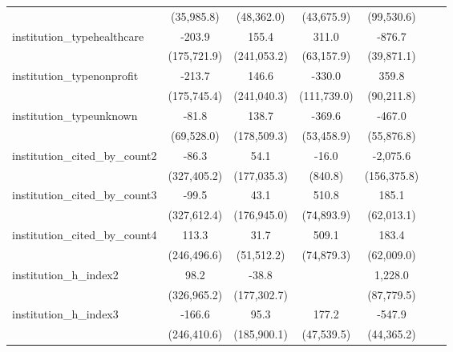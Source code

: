 \begin{tabular}{lcccccc}
                                         & (35,985.8)  & (48,362.0)  & (43,675.9)  & (99,530.6)  &       &   \\   
   institution\_typehealthcare           & -203.9      & 155.4       & 311.0       & -876.7      &       &   \\   
                                         & (175,721.9) & (241,053.2) & (63,157.9)  & (39,871.1)  &       &   \\   
   institution\_typenonprofit            & -213.7      & 146.6       & -330.0      & 359.8       &       &   \\   
                                         & (175,745.4) & (241,040.3) & (111,739.0) & (90,211.8)  &       &   \\   
   institution\_typeunknown              & -81.8       & 138.7       & -369.6      & -467.0      &       &   \\   
                                         & (69,528.0)  & (178,509.3) & (53,458.9)  & (55,876.8)  &       &   \\   
   institution\_cited\_by\_count2        & -86.3       & 54.1        & -16.0       & -2,075.6    &       &   \\   
                                         & (327,405.2) & (177,035.3) & (840.8)     & (156,375.8) &       &   \\   
   institution\_cited\_by\_count3        & -99.5       & 43.1        & 510.8       & 185.1       &       &   \\   
                                         & (327,612.4) & (176,945.0) & (74,893.9)  & (62,013.1)  &       &   \\   
   institution\_cited\_by\_count4        & 113.3       & 31.7        & 509.1       & 183.4       &       &   \\   
                                         & (246,496.6) & (51,512.2)  & (74,879.3)  & (62,009.0)  &       &   \\   
   institution\_h\_index2                & 98.2        & -38.8       &             & 1,228.0     &       &   \\   
                                         & (326,965.2) & (177,302.7) &             & (87,779.5)  &       &   \\   
   institution\_h\_index3                & -166.6      & 95.3        & 177.2       & -547.9      &       &   \\   
                                         & (246,410.6) & (185,900.1) & (47,539.5)  & (44,365.2)  &       &   \\   

\end{tabular}
